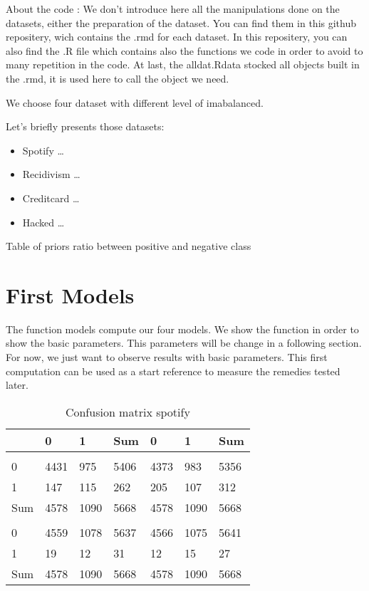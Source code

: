 \documentclass[
]{report}
\providecommand{\tightlist}{%
  \setlength{\itemsep}{0pt}\setlength{\parskip}{0pt}}
\begin{document}
About the code : We don't introduce here all the manipulations done on the datasets, either the preparation of the dataset. You can find them in this github repositery, wich contains the .rmd for each dataset. In this repositery, you can also find the .R file which contains also the functions we code in order to avoid to many repetition in the code. At last, the alldat.Rdata stocked all objects built in the .rmd, it is used here to call the object we need.

We choose four dataset with different level of imabalanced.

Let's briefly presents those datasets:

\begin{itemize}
\tightlist
\item
  Spotify \ldots{}
\item
  Recidivism \ldots{}
\item
  Creditcard \ldots{}
\item
  Hacked \ldots{}
\end{itemize}

Table of priors ratio between positive and negative class

\hypertarget{first-models}{%
\section{First Models}\label{first-models}}

The function models compute our four models. We show the function in order to show the basic parameters. This parameters will be change in a following section. For now, we just want to observe results with basic parameters. This first computation can be used as a start reference to measure the remedies tested later.

\begin{table}

\caption{\label{tab:unnamed-chunk-3}Confusion matrix spotify}
\centering
\begin{tabular}[t]{l|l|l|l|l|l|l}
\hline
  & 0 & 1 & Sum & 0 & 1 & Sum\\
\hline
\cellcolor{lightgrey}{} & \cellcolor{lightgrey}{rf} & \cellcolor{lightgrey}{} & \cellcolor{lightgrey}{} & \cellcolor{lightgrey}{bayes} & \cellcolor{lightgrey}{} & \cellcolor{lightgrey}{}\\
\hline
0 & 4431 & 975 & 5406 & 4373 & 983 & 5356\\
\hline
1 & 147 & 115 & 262 & 205 & 107 & 312\\
\hline
Sum & 4578 & 1090 & 5668 & 4578 & 1090 & \vphantom{1} 5668\\
\hline
\cellcolor{lightgrey}{} & \cellcolor{lightgrey}{lda} & \cellcolor{lightgrey}{} & \cellcolor{lightgrey}{} & \cellcolor{lightgrey}{svm} & \cellcolor{lightgrey}{} & \cellcolor{lightgrey}{}\\
\hline
0 & 4559 & 1078 & 5637 & 4566 & 1075 & 5641\\
\hline
1 & 19 & 12 & 31 & 12 & 15 & 27\\
\hline
Sum & 4578 & 1090 & 5668 & 4578 & 1090 & 5668\\
\hline
\end{tabular}
\end{table}
\end{document}

